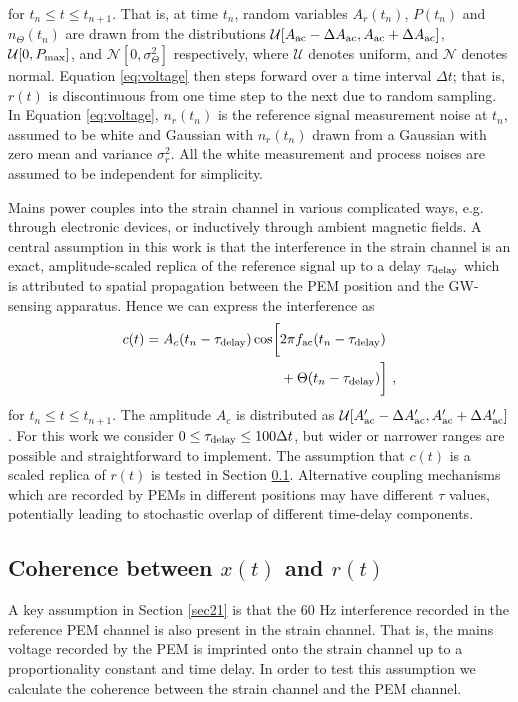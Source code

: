 \documentclass[pra,superscriptaddress,reprint,amsmath,amssymb,nofootinbib]{revtex4-2}
\begin{document}
for $t_n \leq t \leq t_{n+1}$. That is, at time $t_n$, random variables $A_r(t_n)$, $P(t_n)$ and $n_{\Theta} (t_n)$ are drawn from the distributions $\mathcal{U}[A_{\rm ac} - \Delta A_{\rm ac},A_{\rm ac} + \Delta A_{\rm ac} ]$, $\mathcal{U}[0, P_{\rm max}]$, and $\mathcal{N} [0, \sigma_{\Theta}^2]$ respectively, where $\mathcal{U}$ denotes uniform, and $\mathcal{N}$ denotes normal. Equation \eqref{eq:voltage} then steps forward over a time interval $\Delta t$; that is, $r(t)$ is discontinuous from one time step to the next due to random sampling. In Equation \eqref{eq:voltage}, $n_r(t_n)$ is the reference signal measurement noise at $t_n$, assumed to be white and Gaussian with $n_r(t_n)$ drawn from a Gaussian with zero mean and variance $\sigma_r^2$. All the white measurement and process noises are assumed to be independent for simplicity. \newline 

Mains power couples into the strain channel in various complicated ways, e.g. through electronic devices, or inductively through ambient magnetic fields. A central assumption in this work is that the interference in the strain channel is an exact, amplitude-scaled replica of the reference signal up to a delay $\tau_{\rm delay}$ which is attributed to spatial propagation between the PEM position and the GW-sensing apparatus. Hence we can express the interference as 
 \begin{align}
	c(t) = A_c(t_n - \tau_{\rm delay}) \cos \biggl [ & 2 \pi f_{\rm ac} (t_n - \tau_{\rm delay}) \nonumber \\ 
	&+ \Theta(t_n - \tau_{\rm delay}	) \biggr ] \ ,
	\label{eq:vclutter}
\end{align}
for $t_n \leq t \leq t_{n+1}$. The amplitude $A_c$ is distributed as $\mathcal{U}[A'_{\rm ac}- \Delta A'_{\rm ac} ,A'_{\rm ac} + \Delta A'_{\rm ac} ]$. For this work we consider $0 \leq \tau_{\rm delay} \leq 100 \Delta t$, but wider or narrower ranges are possible and straightforward to implement. The assumption that $c(t)$ is a scaled replica of $r(t)$ is tested in Section \ref{sec23}. Alternative coupling mechanisms which are recorded by PEMs in different positions may have different $\tau$ values, potentially leading to stochastic overlap of different time-delay components. 




\subsection{Coherence between $x(t)$ and $r(t)$}  \label{sec23}
A key assumption in Section \ref{sec21} is that the 60 Hz interference recorded in the reference PEM channel is also present in the strain channel. That is, the mains voltage recorded by the PEM is imprinted onto the strain channel up to a proportionality constant and time delay. In order to test this assumption we calculate the coherence between the strain channel and the PEM channel. \newline 
\end{document}
